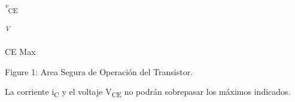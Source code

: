 \documentclass[12pt]{article}
\begin{document}

\begin{adjustwidth}{3.82in}{0.0in}
\textit{\textsuperscript{ v}}\textsubscript{CE}\par

\end{adjustwidth}

\begin{adjustwidth}{3.49in}{0.0in}
\textit{\textsuperscript{V}}{\fontsize{4pt}{4.8pt}\selectfont CE Max\par}\par

\end{adjustwidth}


\vspace{\baselineskip}
\begin{adjustwidth}{0.0in}{0.01in}
\begin{Center}
Figure 1: Area Segura de Operación del Transistor.
\end{Center}\par

\end{adjustwidth}


\vspace{\baselineskip}
\begin{adjustwidth}{1.07in}{0.0in}
{\fontsize{9pt}{10.8pt}\selectfont La corriente i\textsubscript{C} y el voltaje V\textsubscript{CE} no podrán sobrepasar los máximos indicados.\par}\par

\end{adjustwidth}


\vspace{\baselineskip}

\vspace{\baselineskip}
\begin{adjustwidth}{0.0in}{0.01in}
\begin{Center}
{\fontsize{8pt}{9.6pt}\par}
\end{Center}\par

\end{adjustwidth}


\vspace{\baselineskip}

\vspace{\baselineskip}
\end{document}
